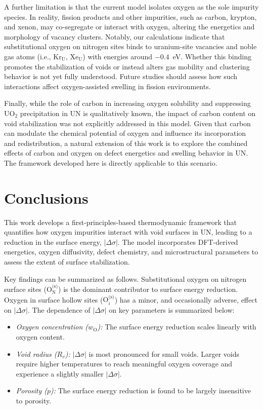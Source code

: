 \documentclass[preprint,12pt,sort&compress]{elsarticle}
\newcommand{\?}{\stackrel{?}{=}}
\begin{document}
A further limitation is that the current model isolates oxygen as the sole impurity species. In reality, fission products and other impurities, such as carbon, krypton, and xenon, may co-segregate or interact with oxygen, altering the energetics and morphology of vacancy clusters. Notably, our calculations indicate that substitutional oxygen on nitrogen sites binds to uranium-site vacancies and noble gas atoms (i.e., Kr$_\text{U}$, Xe$_\text{U}$) with energies around $-0.4$~eV. Whether this binding promotes the stabilization of voids or instead alters gas mobility and clustering behavior is not yet fully understood. Future studies should assess how such interactions affect oxygen-assisted swelling in fission environments.

Finally, while the role of carbon in increasing oxygen solubility and suppressing UO$_2$ precipitation in UN is qualitatively known, the impact of carbon content on void stabilization was not explicitly addressed in this model. Given that carbon can modulate the chemical potential of oxygen and influence its incorporation and redistribution, a natural extension of this work is to explore the combined effects of carbon and oxygen on defect energetics and swelling behavior in UN. The framework developed here is directly applicable to this scenario.

\section{Conclusions}

This work develops a first-principles-based thermodynamic framework that quantifies how oxygen impurities interact with void surfaces in UN, leading to a reduction in the surface energy, $|\Delta \sigma|$. The model incorporates DFT-derived energetics, oxygen diffusivity, defect chemistry, and microstructural parameters to assess the extent of surface stabilization.

Key findings can be summarized as follows. Substitutional oxygen on nitrogen surface sites ($\text{O}_\text{N}^\text{(s)}$) is the dominant contributor to surface energy reduction. Oxygen in surface hollow sites ($\text{O}_i^\text{(s)}$) has a minor, and occasionally adverse, effect on $|\Delta \sigma|$. The dependence of $|\Delta \sigma|$ on key parameters is summarized below:
\begin{itemize}
    \item \textit{Oxygen concentration ($w_\text{O}$):} The surface energy reduction scales linearly with oxygen content.
    \item \textit{Void radius ($R_v$):} $|\Delta \sigma|$ is most pronounced for small voids. Larger voids require higher temperatures to reach meaningful oxygen coverage and experience a slightly smaller $|\Delta \sigma|$.
    \item \textit{Porosity ($p$):} The surface energy reduction is found to be largely insensitive to porosity.
    \end{itemize}
\end{document}

